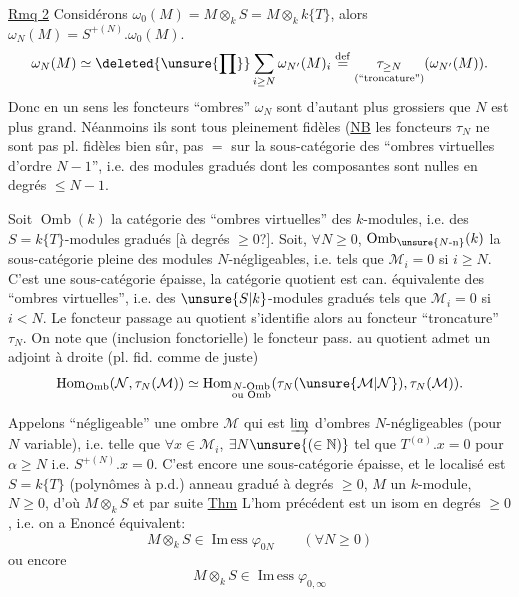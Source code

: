 \uline{Rmq 2} Considérons $\omega_0(M)=M\otimes_k S=M\otimes_k k\{T\}$, alors $\omega_N(M)=S^{+(N)}.\omega_0(M)$.  
\[
\omega_N(M)\simeq\deleted{\unsure{\prod}}\sum_{i\geq N}\omega_{N'}(M)_i\overset{\mathrm{def}}=\underset{\text{(``troncature'')}}{\tau_{\geq N}}(\omega_{N'}(M)).
\]
Donc en
un sens les foncteurs ``ombres'' $\omega_N$ sont d'autant plus grossiers que $N$ est plus grand. Néanmoins ils sont tous pleinement fidèles (\uline{NB} les foncteurs $\tau_N$ ne sont pas pl. fidèles bien sûr, pas $=$ sur la sous-catégorie des ``ombres virtuelles d'ordre $N-1$'', i.e. des modules gradués dont les composantes sont nulles en degrés $\leq N-1$.

Soit $\operatorname{Omb}(k)$ la catégorie des ``ombres virtuelles'' des $k$-modules, i.e. des $S=k\{T\}$-modules gradués [à degrés $\geq0$?]. Soit, $\forall N\geq0$, $\operatorname{Omb}_{\unsure{N\text{-n}}}(k)$ la sous-catégorie pleine des modules $N$-négligeables, i.e. tels que $\mathcal M_i=0$ si $i\geq N$.
C'est une sous-catégorie épaisse, la catégorie quotient est can. équivalente   des ``ombres virtuelles'', i.e. des $\unsure{S|k}$-modules gradués tels que $\mathcal M_i=0$ si $i<N$.
Le foncteur passage au quotient s'identifie alors au foncteur ``troncature'' $\tau_N$. On note que
(inclusion fonctorielle)  le foncteur  pass. au quotient admet un adjoint à droite (pl. fid. comme de juste)
\[
\operatorname{Hom}_{\operatorname{Omb}}(\mathcal N,\tau_N(\mathcal M))\simeq
\operatorname{Hom}_{\substack{N\text{-Omb}\\\text{ou Omb}}}(\tau_N(\unsure{\mathcal M|\mathcal N}),\tau_N(\mathcal M)).
\]

Appelons ``négligeable'' une ombre $\mathcal M$ qui est $\varinjlim$  d'ombres $N$-négligeables (pour $N$ variable), i.e. telle que  $\forall x\in\mathcal M_i$, $\exists N\unsure{(\in\mathbb N)}$ tel que $T^{(\alpha)}.x=0$ pour $\alpha\geq N$ i.e. $S^{+(N)}.x=0$. C'est encore une sous-catégorie épaisse, et le localisé est
$S=k\{T\}$ (polynômes à p.d.) anneau gradué à degrés $\geq0$,
$M$ un $k$-module, $N\geq0$, d'où $M\otimes_kS$ et par suite
\uline{Thm} L'hom précédent est un isom en degrés $\geq0$, i.e. on a
Enoncé équivalent:
\[
M\otimes_kS\in\operatorname{Im\,ess}\varphi_{0N}\qquad(\forall N\geq0)
\]
ou encore
\[
M\otimes_kS\in\operatorname{Im\,ess}\varphi_{0,\infty}
\]

